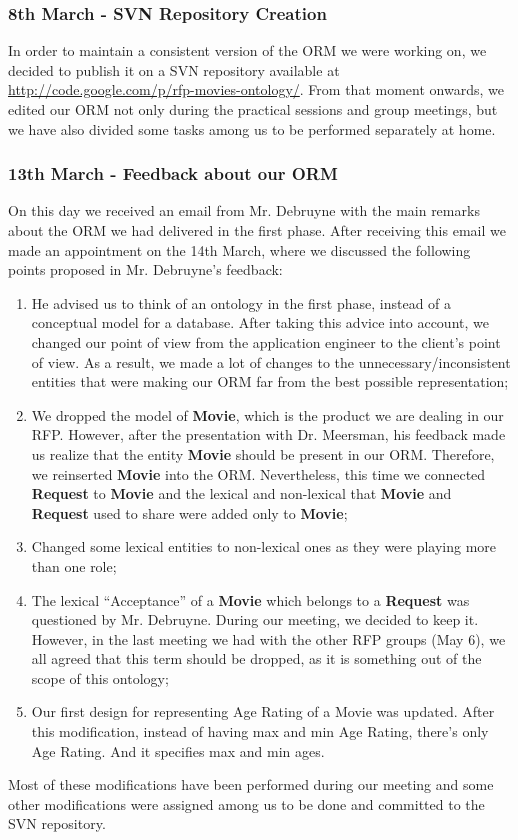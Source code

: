 \documentclass[a4paper,10pt]{article}
\begin{document}
\subsubsection*{8th March - SVN Repository Creation}
In order to maintain a consistent version of the ORM we were working on, we decided to publish it on a SVN repository available at \href{http://code.google.com/p/rfp-movies-ontology/}{http://code.google.com/p/rfp-movies-ontology/}. From that moment onwards, we edited our ORM not only during the practical sessions and group meetings, but we have also divided some tasks among us to be performed separately at home.

\subsubsection*{13th  March - Feedback about our ORM}
On this day we received an email from Mr. Debruyne with the main remarks about the ORM we had delivered in the first phase. After receiving this email we made an appointment on the 14th March, where we discussed the following points proposed in Mr. Debruyne's feedback:
\begin{enumerate}	
  \item He advised us to think of an ontology in the first phase, instead of a conceptual model for a database. After taking this advice into account, we changed our point of view from the application engineer to the client's point of view. As a result, we made a lot of changes to the unnecessary/inconsistent entities that were making our ORM far from the best possible representation;
  \item We dropped the model of \textbf{Movie}, which is the product we are dealing in our RFP. However, after the presentation with Dr. Meersman, his feedback made us realize that the entity \textbf{Movie} should be present in our ORM. Therefore, we reinserted \textbf{Movie} into the ORM. Nevertheless, this time we connected \textbf{Request} to \textbf{Movie} and the lexical and non-lexical that \textbf{Movie} and \textbf{Request} used to share were added only to \textbf{Movie};
  \item Changed some lexical entities to non-lexical ones as they were playing more than one role;
  \item The lexical ``Acceptance'' of a \textbf{Movie} which belongs to a \textbf{Request} was questioned by Mr. Debruyne. During our meeting, we decided to keep it. However, in the last meeting we had with the other RFP groups (May 6), we all agreed that this term should be dropped, as it is something out of the scope of this ontology;
  \item Our first design for representing Age Rating of a Movie was updated. After this modification, instead of having max and min Age Rating, there's only Age Rating. And it specifies max and min ages.
\end{enumerate}
Most of these modifications have been performed during our meeting and some other modifications were assigned among us to be done and committed to the SVN repository.
\end{document}
